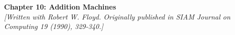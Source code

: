 \documentclass{article}
\title{}
\author{}
\date{}
\begin{document}

\begin{center}
  
  \begin{minipage}{.6\linewidth}
    \begin{center}
      \Huge \textbf{Chapter 10: Addition Machines\\}
      \vspace{.5cm}
      \small \textit{[Written with Robert W. Floyd. Originally published in SIAM Journal on Computing 19 (1990), 329-340.]\\}
    \end{center}
  \end{minipage}

\end{center}

\vspace{1cm}

\end{document}
